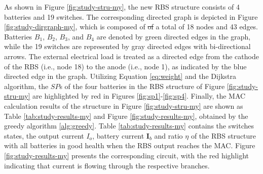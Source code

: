 \documentclass{article}
\providecommand{\DIFdel}[1]{{\protect\color{red}\sout{#1}}}                      %
\providecommand{\DIFdelbegin}{} %
\providecommand{\DIFdelend}{} %
\newcommand{\DIFscaledelfig}{0.5}
\newlength{\DIFdelgraphicswidth} %
\newlength{\DIFdelgraphicsheight} %
\newcommand{\DIFdelincludegraphics}[2][]{%
\sbox{\DIFdelgraphicsbox}{\DIFOincludegraphics[#1]{#2}}%
\settoboxwidth{\DIFdelgraphicswidth}{\DIFdelgraphicsbox} %
\settoboxtotalheight{\DIFdelgraphicsheight}{\DIFdelgraphicsbox} %
\scalebox{\DIFscaledelfig}{%
\parbox[b]{\DIFdelgraphicswidth}{\usebox{\DIFdelgraphicsbox}\\[-\baselineskip] \rule{\DIFdelgraphicswidth}{0em}}\llap{\resizebox{\DIFdelgraphicswidth}{\DIFdelgraphicsheight}{%
\setlength{\unitlength}{\DIFdelgraphicswidth}%
\begin{picture}(1,1)%
\thicklines\linethickness{2pt} %
{\color[rgb]{1,0,0}\put(0,0){\framebox(1,1){}}}%
{\color[rgb]{1,0,0}\put(0,0){\line( 1,1){1}}}%
{\color[rgb]{1,0,0}\put(0,1){\line(1,-1){1}}}%
\end{picture}%
}\hspace*{3pt}}} %
} %
\DeclareRobustCommand{\DIFdelbegin}{\DIFOdelbegin \let\includegraphics\DIFdelincludegraphics} %
\DeclareRobustCommand{\DIFdelend}{\DIFOaddend \let\includegraphics\DIFOincludegraphics} %
\begin{document}
As shown in Figure \ref{fig:study-stru-my}, the new RBS structure consists of 4 batteries and 19 switches. 
The corresponding directed graph is depicted in Figure \ref{fig:study-dirgraph-my}, which is composed of \DIFdelbegin \DIFdel{of }\DIFdelend a total of 18 nodes and 43 edges. 
Batteries $B_1$, $B_2$, $B_3$, and $B_4$ are denoted by green directed edges in the graph, while the 19 switches are represented by gray directed edges with bi-directional arrows. 
The external electrical load is treated as a directed edge from the cathode of the RBS (i.e., node 18) to the anode (i.e., node 1), as indicated by the blue directed edge in the graph.
Utilizing Equation \ref{eq:weight} and the Dijkstra algorithm, the $SP$s of the four batteries in the RBS structure of Figure \ref{fig:study-stru-my} are highlighted by red in Figures \ref{fig:sp1}-\ref{fig:sp4}.
Finally, the MAC calculation results of the structure in Figure \ref{fig:study-stru-my} are shown as Table \ref{tab:study-results-my} and Figure \ref{fig:study-results-my}, obtained by the greedy algorithm \ref{alg:greedy}.
Table \ref{tab:study-results-my} contains the switches states, the output current $I_o$, battery current $\bm{I}_b$ and ratio $\eta$ of the RBS structure with all batteries in good health when the RBS output reaches the MAC.
Figure \ref{fig:study-results-my} presents the corresponding circuit, with the red highlight indicating that current is flowing through the respective branches.
\end{document}
